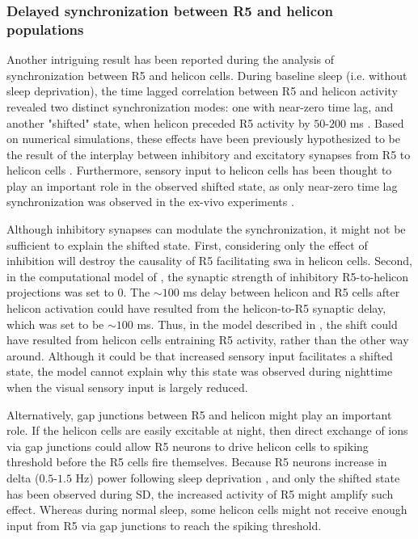 \documentclass[../main.tex]{subfiles}
\begin{document}
\subsubsection{Delayed synchronization between R5 and helicon populations}

Another intriguing result has been reported during the analysis of synchronization between R5 and helicon cells. During baseline sleep (i.e. without sleep deprivation), the time lagged correlation between R5 and helicon activity revealed two distinct synchronization modes: one with near-zero time lag, and another "shifted" state, when helicon preceded R5 activity by $50$-$200$ ms \cite{raccugliaCoherentMultilevelNetwork2022}.
Based on numerical simulations, these effects have been previously hypothesized to be the result of the interplay between inhibitory and excitatory synapses from R5 to helicon cells \cite{raccugliaCoherentMultilevelNetwork2022,krummSlowlyOscillatingBrain2021}.
Furthermore, sensory input to helicon cells has been thought to play an important role in the observed shifted state, as only near-zero time lag synchronization was observed in the ex-vivo experiments \cite{raccugliaCoherentMultilevelNetwork2022}.

Although inhibitory synapses can modulate the synchronization, it might not be sufficient to explain the shifted state. First, considering only the effect of inhibition will destroy the causality of R5 facilitating \gls{swa} in helicon cells. Second, in the computational model of \cite{raccugliaCoherentMultilevelNetwork2022}, the synaptic strength of inhibitory R5-to-helicon projections was set to $0$. The $\sim 100$ ms delay between helicon and R5 cells after helicon activation could have resulted from the helicon-to-R5 synaptic delay, which was set to be $\sim 100$ ms. Thus, in the model described in \cite{raccugliaCoherentMultilevelNetwork2022}, the shift could have resulted from helicon cells entraining R5 activity, rather than the other way around. Although it could be that increased sensory input facilitates a shifted state, the model cannot explain why this state was observed during nighttime when the visual sensory input is largely reduced.

Alternatively, gap junctions between R5 and helicon might play an important role. If the helicon cells are easily excitable at night, then direct exchange of ions via gap junctions could allow R5 neurons to drive helicon cells to spiking threshold before the R5 cells fire themselves. Because R5 neurons increase in delta ($0.5$-$1.5$ Hz) power following sleep deprivation \cite{raccugliaNetworkSpecificSynchronizationElectrical2019}, and only the shifted state has been observed during SD, the increased activity of R5 might amplify such effect. Whereas during normal sleep, some helicon cells might not receive enough input from R5 via gap junctions to reach the spiking threshold.
\end{document}
